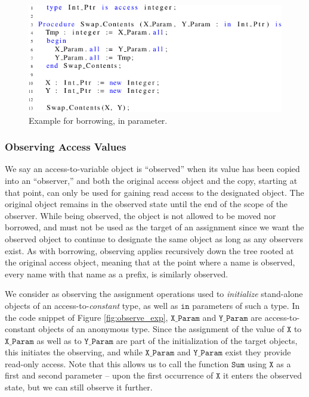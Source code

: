 \documentclass{llncs}
\newcommand\var[1]{\ensuremath{\mathtt{#1}}}
\newcommand{\keyword}[1]{\textsf{#1}}
\begin{document}
\begin{figure}[htb!]
\centering
   \includegraphics[]{borrow_ex1}
   \caption{Example for borrowing, \keyword{in} parameter.}
   \label{fig:borrow_ex1}
\end{figure}


\subsubsection{Observing Access Values}
\label{sec:observing}

We say an access-to-variable object is ``observed'' when its value has been copied into an ``observer,'' and both the original
access object and the copy, starting at that point, can only be used for gaining read access to the designated object.
The original object remains in the observed state until the end of the scope of the observer. While being observed, the object is not allowed to be moved nor
borrowed, and must not be used as the target of an assignment since we want the observed object to continue
to designate the same object as long as any observers exist.  As with borrowing, observing applies recursively down the tree rooted at the original access object, meaning that at the point where a name is observed,
every name with that name as a prefix, is similarly observed.

\smallskip
We consider as observing the assignment operations used to \textit{initialize} stand-alone objects of an access-to-\textit{constant} type, as well as \var{in} parameters of such a type.
In the code snippet of Figure \ref{fig:observe_exp}, \var{X\_Param} and \var{Y\_Param} are access-to-constant objects of an anonymous type. Since the assignment of the value of \var{X} to \var{X\_Param}
as well as to \var{Y\_Param} are part of the initialization of the target objects, this initiates the observing, and while \var{X\_Param} and \var{Y\_Param} exist they provide read-only access. Note that
this allows us to call the function \var{Sum} using \var{X} as a first and second parameter -- upon the first occurrence of \var{X} it enters the observed state, but we can still observe it further. 
\end{document}
